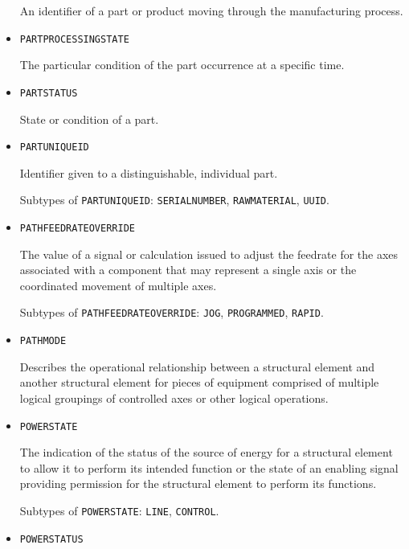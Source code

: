 \begin{itemize}
An identifier of a part or product moving through the manufacturing process.


\item \texttt{PART\textunderscore PROCESSING\textunderscore STATE}  

The particular condition of the part occurrence at a specific time.


\item \texttt{PART\textunderscore STATUS}  

State or condition of a part.


\item \texttt{PART\textunderscore UNIQUE\textunderscore ID}  

Identifier given to a distinguishable, individual part. 

Subtypes of \texttt{PART\textunderscore UNIQUE\textunderscore ID}: \texttt{SERIAL\textunderscore NUMBER}, \texttt{RAW\textunderscore MATERIAL}, \texttt{UUID}.

\item \texttt{PATH\textunderscore FEEDRATE\textunderscore OVERRIDE}  

The value of a signal or calculation issued to adjust the feedrate for the axes associated with a  component that may represent a single axis or the coordinated movement of multiple axes.

Subtypes of \texttt{PATH\textunderscore FEEDRATE\textunderscore OVERRIDE}: \texttt{JOG}, \texttt{PROGRAMMED}, \texttt{RAPID}.

\item \texttt{PATH\textunderscore MODE}  

Describes the operational relationship between a  \gls{structural element} and another  \gls{structural element} for pieces of equipment comprised of multiple logical groupings of controlled axes or other logical operations.


\item \texttt{POWER\textunderscore STATE}  

The indication of the status of the source of energy for a \gls{structural element} to allow it to perform its intended function or the state of an enabling signal providing permission for the \gls{structural element} to perform its functions.

Subtypes of \texttt{POWER\textunderscore STATE}: \texttt{LINE}, \texttt{CONTROL}.

\item \texttt{POWER\textunderscore STATUS}  


\end{itemize}
